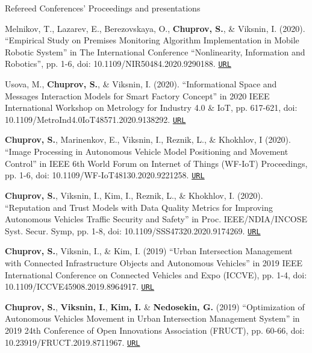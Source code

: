 \begin{rSection}{Refereed Conferences' Proceedings and presentations}
\begin{enumerate}[label=[C{{\arabic*}]}]
\item Melnikov, T., Lazarev, E., Berezovskaya, O., \textbf{Chuprov, S.}, \& Viksnin, I. (2020). ``Empirical Study on Premises Monitoring Algorithm Implementation in Mobile Robotic System'' in The International Conference ``Nonlinearity, Information and Robotics'', pp. 1-6, doi: 10.1109/NIR50484.2020.9290188. \href{https://ieeexplore.ieee.org/document/9290188}{\nolinkurl{URL}}

\item Usova, M., \textbf{Chuprov, S.}, \& Viksnin, I. (2020). ``Informational Space and Messages Interaction Models for Smart Factory Concept'' in 2020 IEEE International Workshop on Metrology for Industry 4.0 \& IoT, pp. 617-621, doi: 10.1109/MetroInd4.0IoT48571.2020.9138292. \href{https://ieeexplore.ieee.org/abstract/document/9138292/}{\nolinkurl{URL}}

\item \textbf{Chuprov, S.},  Marinenkov, E., Viksnin, I., Reznik, L., \& Khokhlov, I (2020). ``Image Processing in Autonomous Vehicle Model Positioning and Movement Control'' in IEEE 6th World Forum on Internet of Things (WF-IoT) Proceedings, pp. 1-6, doi: 10.1109/WF-IoT48130.2020.9221258. \href{https://ieeexplore.ieee.org/document/9221258}{\nolinkurl{URL}}

\item \textbf{Chuprov, S.}, Viksnin, I., Kim, I., Reznik, L., \& Khokhlov, I. (2020). ``Reputation and Trust Models with Data Quality Metrics for Improving Autonomous Vehicles Traffic Security and Safety'' in Proc. IEEE/NDIA/INCOSE Syst. Secur. Symp, pp. 1-8, doi: 10.1109/SSS47320.2020.9174269. \href{https://ieeexplore.ieee.org/document/9174269}{\nolinkurl{URL}}


\item \textbf{Chuprov, S.}, Viksnin, I., \& Kim, I. (2019) ``Urban Intersection Management with Connected Infrastructure Objects and Autonomous Vehicles'' in 2019 IEEE International Conference on Connected Vehicles and Expo (ICCVE), pp. 1-4, doi: 10.1109/ICCVE45908.2019.8964917. \href{https://ieeexplore.ieee.org/abstract/document/8964917}{\nolinkurl{URL}}

\item \textbf{Chuprov, S.}, \textbf{Viksnin, I.}, \textbf{Kim, I.} \& \textbf{Nedosekin, G.} (2019) ``Optimization of Autonomous Vehicles Movement in Urban Intersection Management System'' in 2019 24th Conference of Open Innovations Association (FRUCT), pp. 60-66, doi: 10.23919/FRUCT.2019.8711967. \href{https://ieeexplore.ieee.org/abstract/document/8711967/}{\nolinkurl{URL}}


\end{enumerate}
\end{rSection}
